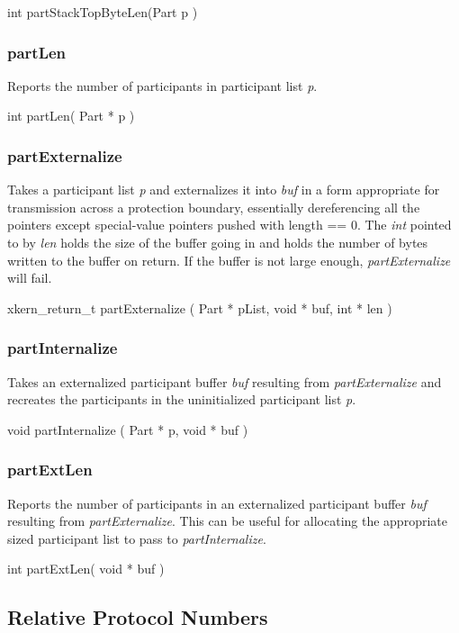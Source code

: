 {\sem int} {\bold partStackTopByteLen}({\sem Part }{\caps p} )
\medskip


\subsubsection{partLen}
Reports the number of participants in participant list {\em p}.\medskip

{\sem int} {\bold partLen}( {\sem Part *} {\caps p} )
\medskip


\subsubsection{partExternalize}
Takes a participant list {\em p} and externalizes it
into {\em buf} in a form appropriate for transmission across a
protection boundary, essentially dereferencing all the pointers
except special-value pointers pushed with length == 0.  The {\em int}
 pointed to by {\em len} holds
the size of the buffer going in and holds the number of bytes written
to the buffer on return.  If the buffer is not large enough, 
{\em partExternalize} will fail.
\medskip

{\sem xkern\_return\_t} {\bold partExternalize}
( {\sem Part *} {\caps pList}, {\sem void *} {\caps buf}, 
  {\sem int *} {\caps len} )
\medskip


\subsubsection{partInternalize}
Takes an externalized participant buffer {\em buf} resulting
from {\em partExternalize} and recreates the participants in the
uninitialized participant list {\em p}.
\medskip

{\sem void} {\bold partInternalize}
( {\sem Part *} {\caps p}, {\sem void *} {\caps buf} )
\medskip


\subsubsection{partExtLen}
Reports the number of participants in an externalized participant
buffer {\em buf} resulting from {\em partExternalize}.  
This can be useful for allocating the appropriate
sized participant list to pass to {\em partInternalize}.
\medskip

{\sem int} {\bold partExtLen}( {\sem void *} {\caps buf} )
\medskip


\subsection{Relative Protocol Numbers}
\label{relprotnum}

